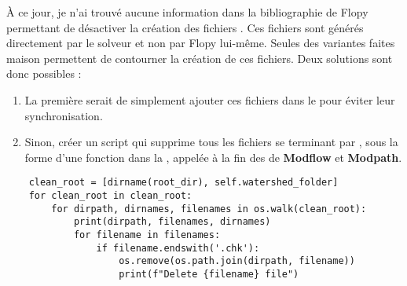 À ce jour, je n’ai trouvé aucune information dans la bibliographie de Flopy permettant de désactiver la création des fichiers . Ces fichiers sont générés directement par le solveur et non par Flopy lui-même. Seules des variantes faites maison permettent de contourner la création de ces fichiers. Deux solutions sont donc possibles :

\begin{enumerate}
    \item La première serait de simplement ajouter ces fichiers dans le  pour éviter leur synchronisation. 
    \item Sinon, créer un script qui supprime tous les fichiers se terminant par , sous la forme d'une fonction  dans la , appelée à la fin des  de \textbf{Modflow} et \textbf{Modpath}.
\end{enumerate}

\begin{verbatim}
    clean_root = [dirname(root_dir), self.watershed_folder] 
    for clean_root in clean_root: 
        for dirpath, dirnames, filenames in os.walk(clean_root): 
            print(dirpath, filenames, dirnames) 
            for filename in filenames: 
                if filename.endswith('.chk'): 
                    os.remove(os.path.join(dirpath, filename)) 
                    print(f"Delete {filename} file") 
\end{verbatim}


